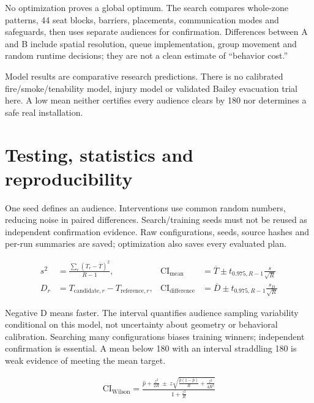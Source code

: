 \documentclass[11pt,a4paper]{article}
\begin{document}
No optimization proves a global optimum. The search compares whole-zone patterns, 44 seat blocks, barriers, placements, communication modes and safeguards, then uses separate audiences for confirmation. Differences between A and B include spatial resolution, queue implementation, group movement and random runtime decisions; they are not a clean estimate of “behavior cost.”


Model results are comparative research predictions. There is no calibrated fire/smoke/tenability model, injury model or validated Bailey evacuation trial here. A low mean neither certifies every audience clears by 180 nor determines a safe real installation.


\section{Testing, statistics and reproducibility}\label{sec:14}

One seed defines an audience. Interventions use common random numbers, reducing noise in paired differences. Search/training seeds must not be reused as independent confirmation evidence. Raw configurations, seeds, source hashes and per-run summaries are saved; optimization also saves every evaluated plan.


\begin{equation}
\begin{aligned}
s^2&=\frac{\sum_r(T_r-\overline T)^2}{R-1}, & \mathrm{CI}_{\mathrm{mean}}&=\overline T\pm t_{0.975,R-1}\frac{s}{\sqrt R} \\
D_r&=T_{\mathrm{candidate},r}-T_{\mathrm{reference},r}, & \mathrm{CI}_{\mathrm{difference}}&=\overline D\pm t_{0.975,R-1}\frac{s_D}{\sqrt R}
\end{aligned}
\tag{19}\label{eq:19}
\end{equation}

Negative D means faster. The interval quantifies audience sampling variability conditional on this model, not uncertainty about geometry or behavioral calibration. Searching many configurations biases training winners; independent confirmation is essential. A mean below 180 with an interval straddling 180 is weak evidence of meeting the mean target.


\begin{equation}
\begin{aligned}
\mathrm{CI}_{\mathrm{Wilson}}=\frac{\displaystyle\widehat p+\frac{z^2}{2R}\ \pm\ z\sqrt{\frac{\widehat p(1-\widehat p)}R+\frac{z^2}{4R^2}}}{\displaystyle1+\frac{z^2}R}
\end{aligned}
\tag{20}\label{eq:20}
\end{equation}
\end{document}
